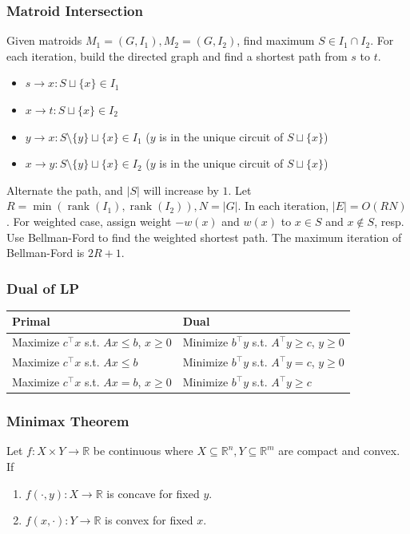 \subsubsection{Matroid Intersection}
Given matroids \(M_1=(G,I_1),M_2=(G,I_2)\), find maximum \(S\in I_1\cap I_2\).
For each iteration, build the directed graph and find a shortest path from \(s\) to \(t\).
\begin{itemize}[nosep]
    \item \(s \to x: S \sqcup \{x\} \in I_1\)
    \item \(x \to t: S \sqcup \{x\} \in I_2\)
    \item \(y \to x: S \setminus \{y\} \sqcup \{x\} \in I_1\) (\(y\) is in the unique circuit of \(S \sqcup \{x\}\))
    \item \(x \to y: S \setminus \{y\} \sqcup \{x\} \in I_2\) (\(y\) is in the unique circuit of \(S \sqcup \{x\}\))
\end{itemize}
Alternate the path, and \(|S|\) will increase by \(1\).
Let \(R = \min(\operatorname{rank}(I_1), \operatorname{rank}(I_2)), N = |G|\).
In each iteration, \(|E| = O(RN)\).
For weighted case, assign weight \(-w(x)\) and \(w(x)\) to \(x\in S\) and \(x\notin S\), resp.
Use Bellman-Ford to find the weighted shortest path.
The maximum iteration of Bellman-Ford is \(2R+1\).

\subsubsection{Dual of LP}

\begin{tabular}{|l|l|}
\hline
\textbf{Primal} & \textbf{Dual} \\
\hline
Maximize $c^\intercal x$ s.t. $Ax \leq b$, $x \geq 0$ & Minimize $b^\intercal y$ s.t. $A^\intercal y \geq c$, $y \geq 0$ \\
\hline
Maximize $c^\intercal x$ s.t. $Ax \leq b$ & Minimize $b^\intercal y$ s.t. $A^\intercal y = c$, $y \geq 0$ \\
\hline
Maximize $c^\intercal x$ s.t. $Ax = b$, $x \geq 0$ & Minimize $b^\intercal y$ s.t. $A^\intercal y \geq c$ \\
\hline
\end{tabular}

\subsubsection{Minimax Theorem}
Let $f : X \times Y \to \mathbb R$ be continuous where $X \subseteq \mathbb R ^ n, Y \subseteq \mathbb R ^ m$ are compact and convex.
If
\begin{enumerate}[nosep]
  \item $f(\cdot, y) : X \to \mathbb R$ is concave for fixed $y$.
  \item $f(x, \cdot) : Y \to \mathbb R$ is convex for fixed $x$.
\end{enumerate}

